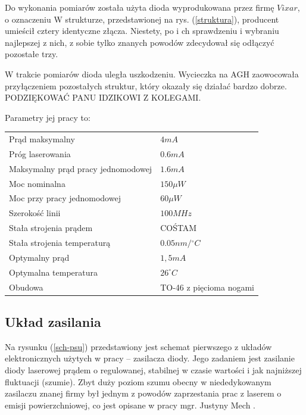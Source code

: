 \documentclass[a4paper,10pt]{article}
\begin{document}
Do wykonania pomiarów została użyta dioda wyprodukowana przez firmę $Vixar$, o oznaczeniu
W strukturze, przedstawionej na rys. (\ref{struktura}), producent umieścił cztery identyczne złącza. Niestety, po i ch sprawdzeniu i wybraniu najlepszej z nich, z sobie tylko znanych powodów zdecydował się odłączyć pozostałe trzy.

W trakcie pomiarów dioda uległa uszkodzeniu. Wycieczka na AGH zaowocowała przyłączeniem pozostałych struktur, który okazały się działać bardzo dobrze. PODZIĘKOWAĆ PANU IDZIKOWI Z KOLEGAMI.

Parametry jej pracy to:
\begin{center}
\begin{tabular}{ll}
Prąd maksymalny & $4mA$\\
Próg laserowania & $0.6mA$\\
Maksymalny prąd pracy jednomodowej & $1.6mA$\\
Moc nominalna & $150\mu W$\\
Moc przy pracy jednomodowej & $60\mu W$\\
Szerokość linii & $100MHz$\\
Stała strojenia prądem & COŚTAM\\
Stała strojenia temperaturą & $0.05 nm/{}^{\circ}C$\\
Optymalny prąd & $1,5mA$\\
Optymalna temperatura & $26^{\circ}C$ \\
Obudowa & TO-46 z pięcioma nogami
\end{tabular}
\end{center}


\subsection{Układ zasilania}

Na rysunku (\ref{sch-psu}) przedstawiony jest schemat pierwszego z układów elektronicznych użytych w pracy -- zasilacza diody. Jego zadaniem jest zasilanie diody laserowej prądem o regulowanej, stabilnej w czasie wartości i jak najniższej fluktuacji (szumie). Zbyt duży poziom szumu obecny w niededykowanym zasilaczu znanej firmy był jednym z powodów zaprzestania prac z laserem o emisji powierzchniowej, co jest opisane w pracy mgr. Justyny Mech \cite{mgrJustynaMech}.
\end{document}
